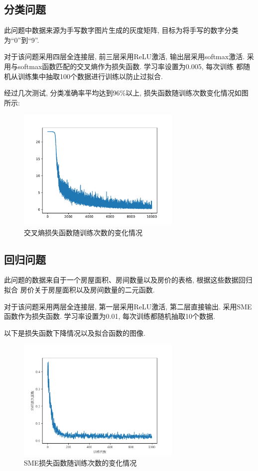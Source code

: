 \subsection{分类问题}

此问题中数据来源为手写数字图片生成的灰度矩阵, 目标为将手写的数字分类为``0''到``9''.

对于该问题采用四层全连接层, 前三层采用ReLU激活, 输出层采用softmax激活.
采用与softmax函数匹配的交叉熵作为损失函数. 学习率设置为0.005, 每次训练
都随机从训练集中抽取100个数据进行训练以防止过拟合.

经过几次测试, 分类准确率平均达到96\%以上, 损失函数随训练次数变化情况如图所示:

\begin{figure}[H]
    \centering
    \includegraphics[width=0.7\textwidth]{figures/classification.pdf}
    \caption{交叉熵损失函数随训练次数的变化情况}
\end{figure}

\subsection{回归问题}

此问题的数据来自于一个房屋面积、房间数量以及房价的表格, 根据这些数据回归拟合
房价关于房屋面积以及房间数量的二元函数.

对于该问题采用两层全连接层, 第一层采用ReLU激活, 第二层直接输出.
采用SME函数作为损失函数. 学习率设置为0.01, 每次训练都随机抽取10个数据.

以下是损失函数下降情况以及拟合函数的图像.

\begin{figure}[H]
    \centering
    \includegraphics[width=0.7\textwidth]{figures/regress-epoch.pdf}
    \caption{SME损失函数随训练次数的变化情况}
\end{figure}

